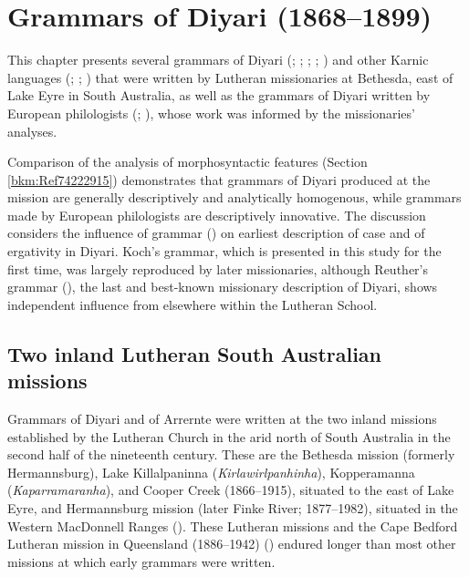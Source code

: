 \chapter{Grammars of Diyari (1868--1899)}
\label{chap:key:8}

This chapter presents several grammars of Diyari (\citealt{koch_untitled_1868}; \citealt{schoknecht_grammar_1947}; \citealt{flierl_dieri_1880}; \citealt{reuther_dieri_1894}; \citeyear{reuther_ms_1899}) and other Karnic languages (\citealt{flierl_dieri_1880}; \citealt{reuther_ms_1901}; \citealt{reuther1901b}) that were written by Lutheran missionaries at Bethesda, east of Lake Eyre in South Australia, as well as the grammars of Diyari written by European philologists (\citealt{planert_australische_1908}; \citealt{gatti_lingua_1930}), whose work was informed by the missionaries' analyses.

Comparison of the analysis of morphosyntactic features (Section \ref{bkm:Ref74222915}) demonstrates that grammars of Diyari produced at the mission are generally descriptively and analytically homogenous, while grammars made by European philologists are descriptively innovative. The discussion considers the influence of  grammar () on  earliest description of case and of ergativity in Diyari. Koch’s grammar, which is presented in this study for the first time, was largely reproduced by later missionaries, although Reuther’s grammar (\citeyear{reuther_dieri_1894}), the last and best-known missionary description of Diyari, shows independent influence from elsewhere within the Lutheran School.

\section{Two inland Lutheran South Australian missions}
\label{sec:key:8.1}\label{bkm:Ref514609803}\label{bkm:Ref456104995}

Grammars of Diyari and of Arrernte were written at the two inland missions established by the Lutheran Church in the arid north of South Australia in the second half of the nineteenth century. These are the Bethesda mission (formerly Hermannsburg), Lake Killalpaninna (\textit{Kirlawirlpanhinha}), Kopperamanna (\textit{Kapa\-rra\-maranha}), and Cooper Creek (1866--1915), situated to the east of Lake Eyre, and Hermannsburg mission (later Finke River; 1877--1982), situated in the Western MacDonnell Ranges (). These Lutheran missions and the Cape Bedford Lutheran mission in Queensland (1886--1942) () endured longer than most other missions at which early grammars were written.

